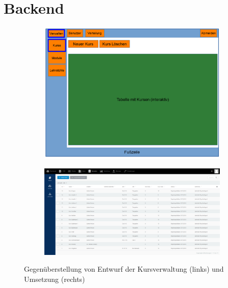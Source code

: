     
    \section{Backend}
        \begin{figure}
            \centering
            \begin{subfigure}{0.49\textwidth}
                \includegraphics[width=1.0\textwidth]{./implementation/images/MockUpsBackend/backendManageCourses.png}
            \end{subfigure}
            \begin{subfigure}{0.49\textwidth}
                \includegraphics[width=1.0\textwidth]{./implementation/images/manageCourses.png}
            \end{subfigure}
            \caption{Gegenüberstellung von Entwurf der Kursverwaltung (links) und Umsetzung (rechts)}
            \label{fig:comparisonManageCourses}
        \end{figure}
        
